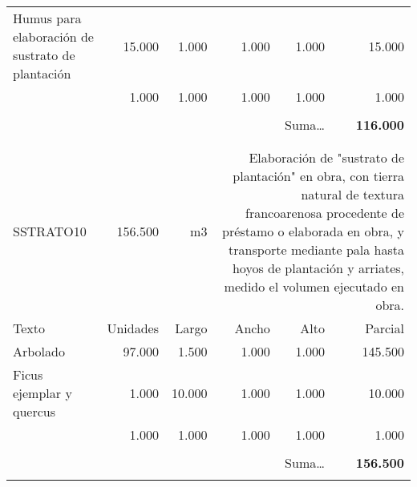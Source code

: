 \documentclass{book}%
\begin{document}
\begin{longtable}{lrrrrr}
\multicolumn{1}{p{3.5cm}}{Humus para elaboración de sustrato de plantación}&15.000&1.000&1.000&1.000&15.000\\%
\multicolumn{1}{p{3.5cm}}{}&1.000&1.000&1.000&1.000&1.000\\%
&&&&&\\%
\multicolumn{5}{r}{Suma\ldots}&\textbf{116.000}\\%
\hline%
&&&&&\\%
&&&&&\\%
SSTRATO10&156.500& m3&\multicolumn{3}{p{6cm}}{\scriptsize Elaboración de "sustrato de plantación" en obra, con tierra natural de textura francoarenosa procedente de préstamo o elaborada en obra, y transporte mediante pala hasta hoyos de plantación y arriates, medido el volumen ejecutado en obra.\normalsize}\\%
Texto&Unidades&Largo&Ancho&Alto&Parcial\\%
\hline%
\multicolumn{1}{p{3.5cm}}{Arbolado}&97.000&1.500&1.000&1.000&145.500\\%
\multicolumn{1}{p{3.5cm}}{Ficus ejemplar y quercus}&1.000&10.000&1.000&1.000&10.000\\%
\multicolumn{1}{p{3.5cm}}{}&1.000&1.000&1.000&1.000&1.000\\%
&&&&&\\%
\multicolumn{5}{r}{Suma\ldots}&\textbf{156.500}\\%
\hline%
&&&&&\\%
\end{longtable}%
\newpage

%
\end{document}
